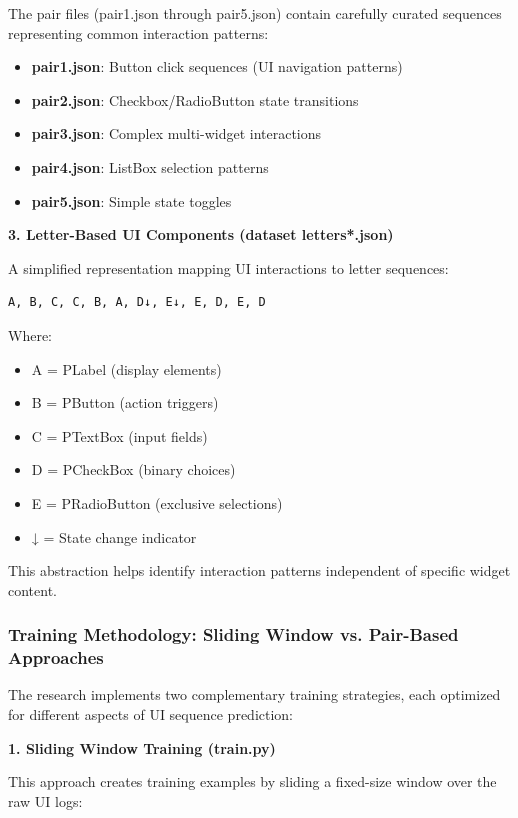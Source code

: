 \documentclass[12pt,a4paper]{article}
\begin{document}
The pair files (pair1.json through pair5.json) contain carefully curated sequences representing common interaction patterns:
\begin{itemize}
\item \textbf{pair1.json}: Button click sequences (UI navigation patterns)
\item \textbf{pair2.json}: Checkbox/RadioButton state transitions
\item \textbf{pair3.json}: Complex multi-widget interactions
\item \textbf{pair4.json}: ListBox selection patterns
\item \textbf{pair5.json}: Simple state toggles
\end{itemize}

\textbf{3. Letter-Based UI Components (dataset letters*.json)}

A simplified representation mapping UI interactions to letter sequences:

\begin{verbatim}
A, B, C, C, B, A, D↓, E↓, E, D, E, D
\end{verbatim}

Where:
\begin{itemize}
\item A = PLabel (display elements)
\item B = PButton (action triggers)
\item C = PTextBox (input fields)
\item D = PCheckBox (binary choices)
\item E = PRadioButton (exclusive selections)
\item ↓ = State change indicator
\end{itemize}

This abstraction helps identify interaction patterns independent of specific widget content.

\subsubsection{Training Methodology: Sliding Window vs. Pair-Based Approaches}

The research implements two complementary training strategies, each optimized for different aspects of UI sequence prediction:

\textbf{1. Sliding Window Training (train.py)}

This approach creates training examples by sliding a fixed-size window over the raw UI logs:
\end{document}
